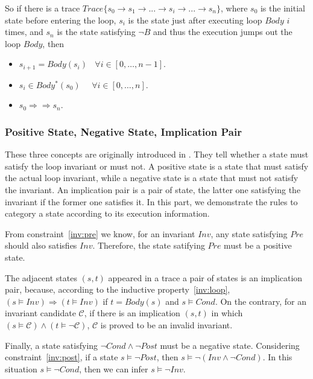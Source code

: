 So if there is a trace $Trace\{s_0 \to s_1 \to ...\to s_i \to ... \to s_n\}$, 
where $s_0$ is the initial state before entering the loop, 
$s_i$ is the state just after executing loop $Body$ $i$ times,
and $s_n$ is the state satisfying $\neg B$ and thus the execution jumps out the loop $Body$,
then 
\begin{itemize}
\item $s_{i+1} = Body(s_i)~~~~\forall i \in [0, \ldots, n-1]$.
\item $s_{i} \in Body^*(s_0)~~~~~~\forall i \in [0, \ldots, n]$.
\item $s_{0} \Rightarrow\Rightarrow s_{n}$.
\end{itemize}



\subsubsection*{Positive State, Negative State, Implication Pair}

These three concepts are originally introduced in \cite{sharma2014invariant}.
They tell whether a state must satisfy the loop invariant or must not.
A positive state is a state that must satisfy the actual loop invariant,
while a negative state is a state that must not satisfy the invariant.
An implication pair is a pair of state, the latter one satisfying the invariant 
if the former one satisfies it. 
In this part, we demonstrate the rules to category a state according to its execution information.


From constraint~\ref{inv:pre} we know, for an invariant $Inv$, 
any state satisfying $Pre$ should also satisfies $Inv$. 
Therefore, the state satifying $Pre$ must be a positive state. 


The adjacent states $(s, t)$ appeared in a trace a pair of states is an implication pair,
because, according to the inductive property~\ref{inv:loop},
$(s \models Inv) \Rightarrow (t \models {Inv})$
if $t = Body(s)$ and $s \models Cond$.
On the contrary, for an invariant candidate $\mathcal{C}$, 
if there is an implication $(s, t)$ in which $(s \models \mathcal{C}) \wedge (t \models \neg \mathcal{C})$,
$\mathcal{C}$ is proved to be an invalid invariant.

Finally, a state satisfying $\neg{Cond} \wedge \neg{Post}$ must be a negative state.
Considering constraint~\ref{inv:post}, if a state $s \models \neg{Post}$,
then $s \models \neg(Inv \wedge \neg Cond)$.
In this situation $s \models \neg Cond$, then we can infer $s \models \neg Inv$. 



